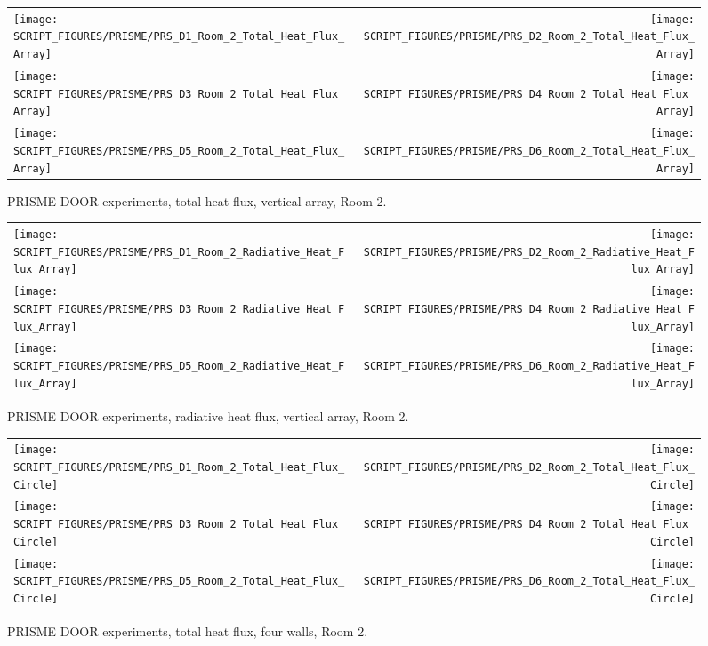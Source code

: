 \begin{figure}[p]
\begin{tabular*}{\textwidth}{l@{\extracolsep{\fill}}r}
\texttt{[image: SCRIPT\_FIGURES/PRISME/PRS\_D1\_Room\_2\_Total\_Heat\_Flux\_Array]} &
\texttt{[image: SCRIPT\_FIGURES/PRISME/PRS\_D2\_Room\_2\_Total\_Heat\_Flux\_Array]} \\
\texttt{[image: SCRIPT\_FIGURES/PRISME/PRS\_D3\_Room\_2\_Total\_Heat\_Flux\_Array]} &
\texttt{[image: SCRIPT\_FIGURES/PRISME/PRS\_D4\_Room\_2\_Total\_Heat\_Flux\_Array]} \\
\texttt{[image: SCRIPT\_FIGURES/PRISME/PRS\_D5\_Room\_2\_Total\_Heat\_Flux\_Array]} &
\texttt{[image: SCRIPT\_FIGURES/PRISME/PRS\_D6\_Room\_2\_Total\_Heat\_Flux\_Array]}
\end{tabular*}
\caption[PRISME DOOR experiments, total heat flux, vertical array, Room 2]{PRISME DOOR experiments, total heat flux, vertical array, Room 2.}
\label{PRISME_Wall_Array_THF_Room_2}
\end{figure}

\begin{figure}[p]
\begin{tabular*}{\textwidth}{l@{\extracolsep{\fill}}r}
\texttt{[image: SCRIPT\_FIGURES/PRISME/PRS\_D1\_Room\_2\_Radiative\_Heat\_Flux\_Array]} &
\texttt{[image: SCRIPT\_FIGURES/PRISME/PRS\_D2\_Room\_2\_Radiative\_Heat\_Flux\_Array]} \\
\texttt{[image: SCRIPT\_FIGURES/PRISME/PRS\_D3\_Room\_2\_Radiative\_Heat\_Flux\_Array]} &
\texttt{[image: SCRIPT\_FIGURES/PRISME/PRS\_D4\_Room\_2\_Radiative\_Heat\_Flux\_Array]} \\
\texttt{[image: SCRIPT\_FIGURES/PRISME/PRS\_D5\_Room\_2\_Radiative\_Heat\_Flux\_Array]} &
\texttt{[image: SCRIPT\_FIGURES/PRISME/PRS\_D6\_Room\_2\_Radiative\_Heat\_Flux\_Array]}
\end{tabular*}
\caption[PRISME DOOR experiments, radiative heat flux, vertical array, Room 2]{PRISME DOOR experiments, radiative heat flux, vertical array, Room 2.}
\label{PRISME_Wall_Array_RHF_Room_2}
\end{figure}

\begin{figure}[p]
\begin{tabular*}{\textwidth}{l@{\extracolsep{\fill}}r}
\texttt{[image: SCRIPT\_FIGURES/PRISME/PRS\_D1\_Room\_2\_Total\_Heat\_Flux\_Circle]} &
\texttt{[image: SCRIPT\_FIGURES/PRISME/PRS\_D2\_Room\_2\_Total\_Heat\_Flux\_Circle]} \\
\texttt{[image: SCRIPT\_FIGURES/PRISME/PRS\_D3\_Room\_2\_Total\_Heat\_Flux\_Circle]} &
\texttt{[image: SCRIPT\_FIGURES/PRISME/PRS\_D4\_Room\_2\_Total\_Heat\_Flux\_Circle]} \\
\texttt{[image: SCRIPT\_FIGURES/PRISME/PRS\_D5\_Room\_2\_Total\_Heat\_Flux\_Circle]} &
\texttt{[image: SCRIPT\_FIGURES/PRISME/PRS\_D6\_Room\_2\_Total\_Heat\_Flux\_Circle]}
\end{tabular*}
\caption[PRISME DOOR experiments, total heat flux, four walls, Room 2]{PRISME DOOR experiments, total heat flux, four walls, Room 2.}
\label{PRISME_Wall_Circle_THF_Room_2}
\end{figure}



